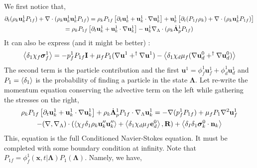 We first notice that, 
\begin{multline}
    \partial_t (\rho_k \textbf{u}_k^1 P_{1f})
    + \mathbf{\nabla}\cdot (
         \rho_k \textbf{u}_k^1 \textbf{u}_k^1 P_{1f})
    = \rho_k P_{1f} \left[\partial_t \textbf{u}_k^1 
        +\textbf{u}_k^1 \cdot \mathbf{\nabla} \textbf{u}_k^1 
    \right]
    + \textbf{u}_k^1 \left[
        \partial_t (P_{1f}\rho_k)
        +\mathbf{\nabla}\cdot(\rho_k \textbf{u}_k^1 P_{1f})
    \right]\\
    = \rho_k P_{1f} \left[\partial_t \textbf{u}_k^1 
        +\textbf{u}_k^1 \cdot \mathbf{\nabla} \textbf{u}_k^1 
    \right]
    - \textbf{u}_k^1 
        \mathbf{\nabla}_\Lambda \cdot ( \rho_k \dot{\bm\Lambda}_p^1 P_{1f})
    \\
\end{multline}
It can also be express (and it might be better) : 
\begin{multline}
    \left<\delta_1 \chi_f \bm\sigma_f^1\right>
    = 
    - p_f^1 P_{1f} \textbf{I}
    + \mu_f P_1 (\mathbf{\nabla} \textbf{u}^1 + ^\dagger \mathbf{\nabla} \textbf{u}^1)
    - \left<\delta_1\chi_d \mu_f (\mathbf{\nabla} \textbf{u}_d^0 + ^\dagger \mathbf{\nabla} \textbf{u}_d^0)\right>\\
\end{multline}
The second term is the particle contribution and the first $\textbf{u}^1  =  \phi_f^1 \textbf{u}_f^1 + \phi_d^1 \textbf{u}_d^1 $ and $P_1 = \left<\delta_1\right>$ is the probability of finding a particle in the state $\bm\Lambda$. 
Let re-write the momentum equation conserving the advective term on the left while gathering the stresses on  the right, 
\begin{multline}
    \rho_k P_{1f} \left[\partial_t \textbf{u}_k^1 
        +\textbf{u}_k^1 \cdot \mathbf{\nabla} \textbf{u}_k^1 
    \right]
    +  \rho_k \dot{\bm\Lambda}_p^1 P_{1f} \cdot \mathbf{\nabla}_\Lambda \textbf{u}_k^1 
    =  - \mathbf{\nabla} (p_f^1 P_{1f})
    + \mu_f P_1 \mathbf{\nabla}^2 \textbf{u}_f^1
    \\
    - (\mathbf{\nabla},\mathbf{\nabla}_\Lambda) \cdot (\left<\chi_f \delta_1 \rho_k \textbf{u}''_k\textbf{u}''_k\right> + \left<\delta_1 \chi_d \mu_f \textbf{e}_d^0\right>,\textbf{R})
    + \left<\delta_I\delta_1
         \bm\sigma_k^0
    \cdot \textbf{n}_k\right>\\
\end{multline}
This, equation is the full Conditioned Navier-Stokes equation. 
It must be completed with some boundary condition at infinity. 
Note that $P_{1f} = \phi_f^1(\textbf{x},t|\bm\Lambda) P_1(\bm\Lambda)$.
Namely, we have, 
